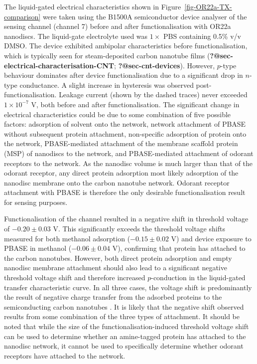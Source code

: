 \documentclass[
  a4paper,
]{scrbook}
\begin{document}
The liquid-gated electrical characteristics shown in
Figure~\ref{fig-OR22a-TX-comparison} were taken using the B1500A
semiconductor device analyser of the sensing channel (channel 7) before
and after functionalisation with OR22a nanodiscs. The liquid-gate
electrolyte used was \(1 \times\) PBS containing 0.5\% v/v DMSO. The
device exhibited ambipolar characteristics before functionalisation,
which is typically seen for steam-deposited carbon nanotube films
(\textbf{?@sec-electrical-characterisation-CNT};
\textbf{?@sec-cnt-devices}). However, \(p\)-type behaviour dominates
after device functionalisation due to a significant drop in \(n\)-type
conductance. A slight increase in hysteresis was observed
post-functionalisation. Leakage current (shown by the dashed traces)
never exceeded \(1 \times 10^{-7}\) V, both before and after
functionalisation. The significant change in electrical characteristics
could be due to some combination of five possible factors: adsorption of
solvent onto the network, network attachment of PBASE without subsequent
protein attachment, non-specific adsorption of protein onto the network,
PBASE-mediated attachment of the membrane scaffold protein (MSP) of
nanodiscs to the network, and PBASE-mediated attachment of odorant
receptors to the network. As the nanodisc volume is much larger than
that of the odorant receptor, any direct protein adsorption most likely
adsorption of the nanodisc membrane onto the carbon nanotube network.
Odorant receptor attachment with PBASE is therefore the only desirable
functionalisation result for sensing purposes.

Functionalisation of the channel resulted in a negative shift in
threshold voltage of \(-0.20 \pm 0.03\) V. This significantly exceeds
the threshold voltage shifts measured for both methanol adsorption
(\(-0.15 \pm 0.02\) V) and device exposure to PBASE in methanol
(\(-0.06 \pm 0.04\) V), confirming that protein has attached to the
carbon nanotubes. However, both direct protein adsorption
\autocite{Bradley2004,Heller2008,Kauffman2008} and empty nanodisc
membrane attachment \autocite{Murugathas2019a} should also lead to a
significant negative threshold voltage shift and therefore increased
\(p\)-conduction in the liquid-gated transfer characteristic curve. In
all three cases, the voltage shift is predominantly the result of
negative charge transfer from the adsorbed proteins to the
semiconducting carbon nanotubes
\autocite{Bradley2004,Heller2008,Murugathas2019a}. It is likely that the
negative shift observed results from some combination of the three types
of attachment. It should be noted that while the size of the
functionalisation-induced threshold voltage shift can be used to
determine whether an amine-tagged protein has attached to the nanodisc
network, it cannot be used to specifically determine whether odorant
receptors have attached to the network.
\end{document}
